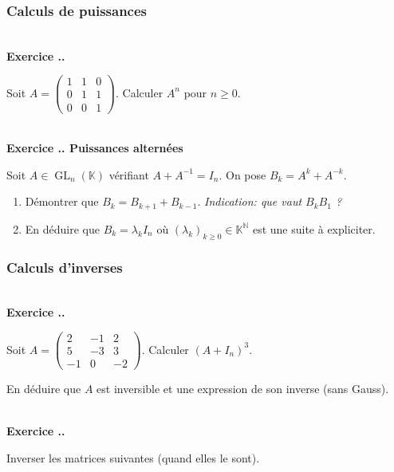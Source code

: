 \documentclass{article}
\newcommand{\mb}[1]{\mathbb{#1}}
\newcommand{\GL}{\operatorname{GL}}
\newcounter{exo}
\newcommand{\exercice}[1][\null]{\textbf{\\ Exercice \thesection.\theexo. #1} \addtocounter{exo}{1}}
\begin{document}
\subsubsection{Calculs de puissances}


\exercice

Soit $A = \begin{pmatrix} 1 & 1 & 0 \\ 0& 1& 1 \\ 0 &  0& 1 \end{pmatrix}$. Calculer $A^n$ pour $n \ge 0$.

\exercice[Puissances alternées]

Soit $A \in \GL_n(\mb{K})$ vérifiant $A + A^{-1} = I_n$. On pose $B_k = A^k + A^{-k} $.

\begin{enumerate}

\item Démontrer que $B_k = B_{k+1} +B_{k-1}$. \emph{Indication: que vaut $B_k B_1$ ?}

\item En déduire que $B_k = \lambda_k I_n$ où $(\lambda_k)_{k \ge 0} \in \mb{K}^{\mb{N}}$ est une suite à expliciter.

\end{enumerate}



\subsubsection{Calculs d'inverses}




\exercice

Soit $A = \begin{pmatrix} 2 & -1 & 2 \\ 5& -3& 3 \\ -1 & 0 & -2 \end{pmatrix}$. Calculer $(A+I_n)^3$.

En déduire que $A$ est inversible et une expression de son inverse (sans Gauss).




\exercice

Inverser les matrices suivantes (quand elles le sont).
\end{document}
